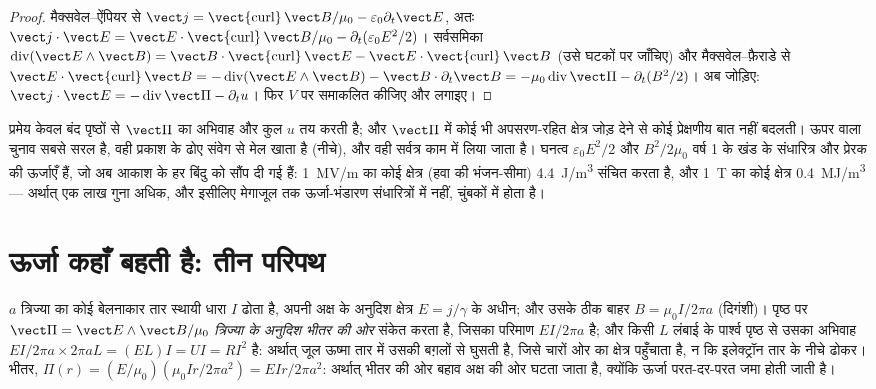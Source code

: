 \begin{proof}
मैक्सवेल--ऐंपियर से $\vect j = \operatorname{\vect{curl}}\vect B/\mu_0 - \varepsilon_0\partial_t
\vect E$, अतः $\vect j\cdot\vect E = \vect E\cdot\operatorname{\vect{curl}}\vect B/\mu_0 -
\partial_t(\varepsilon_0E^2/2)$। सर्वसमिका $\operatorname{div}(\vect E\wedge\vect B) = \vect B
\cdot\operatorname{\vect{curl}}\vect E - \vect E\cdot\operatorname{\vect{curl}}\vect B$ (उसे
घटकों पर जाँचिए) और मैक्सवेल--फ़ैराडे से $\vect E\cdot\operatorname{\vect{curl}}
\vect B = -\operatorname{div}(\vect E\wedge\vect B) - \vect B\cdot\partial_t\vect B = -\mu_0
\operatorname{div}\vect\Pi - \partial_t(B^2/2)$। अब जोड़िए: $\vect j\cdot\vect E = -\operatorname{div}
\vect\Pi - \partial_tu$। फिर $V$ पर समाकलित कीजिए और  लगाइए।
\end{proof}

\begin{remark}[क्या तय है और क्या नहीं]\label{rem:b2:poynting-vector:interpretation}
प्रमेय केवल बंद पृष्ठों से $\vect\Pi$ का अभिवाह और कुल $u$ तय करती है;
और $\vect\Pi$ में कोई भी अपसरण-रहित क्षेत्र जोड़ देने से कोई प्रेक्षणीय
बात नहीं बदलती। ऊपर वाला चुनाव सबसे सरल है, वही प्रकाश के ढोए संवेग से
मेल खाता है (नीचे), और वही सर्वत्र
काम में लिया जाता है। घनत्व $\varepsilon_0E^2/2$ और $B^2/2\mu_0$ वर्ष 1 के खंड के
संधारित्र और प्रेरक की ऊर्जाएँ हैं,
जो अब आकाश के हर बिंदु को सौंप दी गई हैं: \qty{1}{MV/m} का कोई क्षेत्र (हवा
की भंजन-सीमा) \qty{4.4}{J/m^3} संचित करता है, और \qty{1}{T} का कोई क्षेत्र
\qty{0.4}{MJ/m^3} --- अर्थात् एक लाख गुना अधिक, और इसीलिए मेगाजूल तक
ऊर्जा-भंडारण संधारित्रों में नहीं, चुंबकों में होता है।
\end{remark}

\section{ऊर्जा कहाँ बहती है: तीन परिपथ}

\begin{example}[प्रतिरोधी तार]\label{ex:b2:poynting-vector:wire}
$a$ त्रिज्या का कोई बेलनाकार तार स्थायी धारा $I$ ढोता है, अपनी अक्ष के
अनुदिश क्षेत्र $E = j/\gamma$ के अधीन; और उसके ठीक बाहर $B = \mu_0I/2\pi a$
(दिगंशी)। पृष्ठ पर $\vect\Pi = \vect E\wedge\vect B/\mu_0$
\emph{त्रिज्या के अनुदिश भीतर की ओर} संकेत करता है, जिसका परिमाण $EI/2\pi a$ है; और किसी
$L$ लंबाई के पार्श्व पृष्ठ से उसका अभिवाह $EI/2\pi a\times2\pi aL = (EL)I = UI =
RI^2$ है: अर्थात् जूल ऊष्मा तार में उसकी बग़लों से घुसती है, जिसे
चारों ओर का क्षेत्र पहुँचाता है, न कि इलेक्ट्रॉन तार के नीचे ढोकर।
भीतर, $\Pi(r) = (E/\mu_0)(\mu_0Ir/2\pi a^2) = EIr/2\pi a^2$: अर्थात् भीतर की ओर बहाव
अक्ष की ओर घटता जाता है, क्योंकि ऊर्जा परत-दर-परत जमा होती जाती है।
\end{example}

